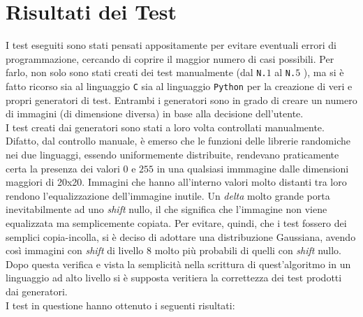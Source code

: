 \documentclass[11pt, a4paper]{article}
\begin{document}
\section{Risultati dei Test}
I test eseguiti sono stati pensati appositamente per evitare eventuali errori di programmazione, cercando di coprire il maggior numero di casi possibili. Per farlo, non solo sono stati creati dei test manualmente (dal \texttt{N.$1$} al \texttt{N.$5$} ), ma si è fatto ricorso sia al linguaggio \texttt{C} sia al linguaggio \texttt{Python} per la creazione di veri e propri generatori di test. Entrambi i generatori sono in grado di creare un numero di immagini (di dimensione diversa) in base alla decisione dell'utente. \\
I test creati dai generatori sono stati a loro volta controllati manualmente. Difatto, dal controllo manuale, è emerso che le funzioni delle librerie randomiche nei due linguaggi, essendo uniformemente distribuite, rendevano praticamente certa la presenza dei valori $0$ e $255$ in una qualsiasi immmagine dalle dimensioni maggiori di 20x20. Immagini che hanno all'interno valori molto distanti tra loro rendono l'equalizzazione dell'immagine inutile. Un \textit{delta} molto grande porta inevitabilmente ad uno \textit{shift} nullo, il che significa che l'immagine non viene equalizzata ma semplicemente copiata. Per evitare, quindi, che i test fossero dei semplici copia-incolla, si è deciso di adottare una distribuzione Gaussiana, avendo così immagini con \textit{shift} di livello $8$ molto più probabili di quelli con \textit{shift} nullo. Dopo questa verifica e vista la semplicità nella scrittura di quest'algoritmo in un linguaggio ad alto livello si è supposta veritiera la correttezza dei test prodotti dai generatori. \\
I test in questione hanno ottenuto i seguenti risultati:
\end{document}
